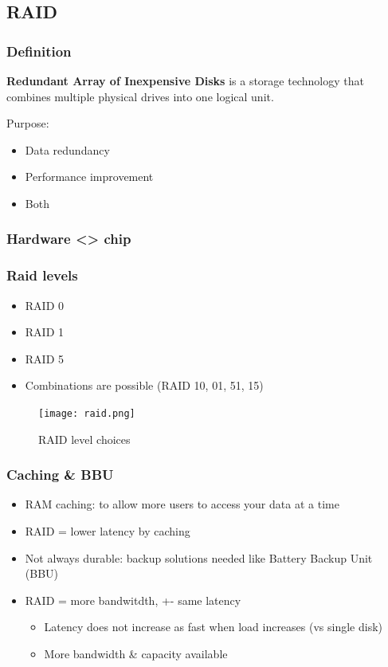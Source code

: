 \documentclass{article}
\begin{document}
\subsection{RAID}

\subsubsection{Definition}

\textbf{Redundant Array of Inexpensive Disks} is a storage technology that combines multiple physical drives into one logical unit.

Purpose:

\begin{itemize}
    \item Data redundancy
    \item Performance improvement
    \item Both
\end{itemize}

\subsubsection{Hardware <> chip}


\subsubsection{Raid levels}

\begin{itemize}
    \item RAID 0
    \item RAID 1
    \item RAID 5
    \item Combinations are possible (RAID 10, 01, 51, 15)
\end{itemize}

\begin{figure}[H]
    \centering
    \texttt{[image: raid.png]}
    \caption{RAID level choices}
\end{figure}

\subsubsection{Caching \& BBU}

\begin{itemize}
    \item RAM caching: to allow more users to access your data at a time
    \item RAID = lower latency by caching
    \item Not always durable: backup solutions needed like Battery Backup Unit (BBU)
    \item RAID = more bandwitdth, +- same latency
    \begin{itemize}
        \item Latency does not increase as fast when load increases (vs single disk)
        \item More bandwidth \& capacity available
    \end{itemize}
\end{itemize}
\end{document}
